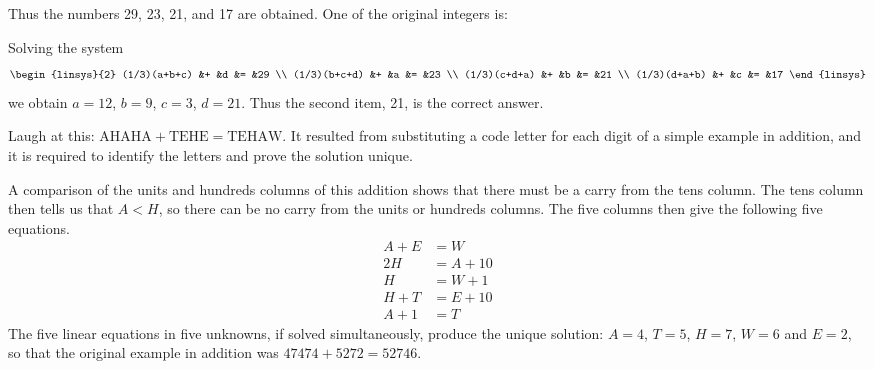 \begin{exercises}
    Thus the numbers 29, 23, 21, and 17 are obtained.
    One of the original integers is:
    \begin{exparts*}
    \end{exparts*}
    \begin{answer}
      Solving the system 
      \begin{equation*}
        \begin{linsys}{2}
        (1/3)(a+b+c)  &+  &d  &=  &29  \\
        (1/3)(b+c+d)  &+  &a  &=  &23  \\
        (1/3)(c+d+a)  &+  &b  &=  &21  \\
        (1/3)(d+a+b)  &+  &c  &=  &17
        \end{linsys}
      \end{equation*}
      we obtain $a=12$, $b=9$, $c=3$, $d=21$.
      Thus the second item, 21, is the correct answer.
     \end{answer}
  \puzzle \recommended \item  
      \cite{Monthly35p47}
      Laugh at this:  \( \mbox{AHAHA}+\mbox{TEHE}=\mbox{TEHAW} \).
      It resulted from substituting a code letter for each digit of a simple
      example in addition, and it is required to identify the letters
      and prove the solution unique.
      \begin{answer}
        \answerasgiven
        A comparison of the units and hundreds columns of this
        addition shows that there must be a carry from the tens column.
        The tens column then tells us that \( A<H \), so there
        can be no carry from the units or hundreds columns.
        The five columns then give the following five equations.
        \begin{align*}
          A+E  &=  W  \\
          2H   &=  A+10  \\
          H    &=  W+1  \\
          H+T  &=  E+10  \\
          A+1  &=  T
        \end{align*}
        The five linear equations in five unknowns, if solved simultaneously,
        produce the unique solution: \( A=4 \), \( T=5 \), \( H=7 \),
        \( W=6 \) and \( E=2 \), so that the original example in addition
        was \( 47474+5272=52746 \).  
      \end{answer}
  \puzzle \item 

\end{exercises}
